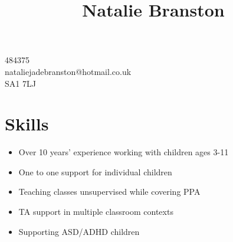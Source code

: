 \documentclass[10pt]{article}
\title{\bfseries\Huge Natalie Branston}
\date{}
\author{}
\begin{document}
\maketitle \vspace{-7em}

\section*{}
\faPhone {} 484375\\
\faEnvelope \quad nataliejadebranston@hotmail.co.uk\\
\faMapMarker \quad SA1 7LJ

\section*{Skills}
\begin{itemize} \setlength\itemsep{-0.25em}
    \item Over 10 years' experience working with children ages 3-11
	\item One to one support for individual children
	\item Teaching classes unsupervised while covering PPA
	\item TA support in multiple classroom contexts
	\item Supporting ASD/ADHD children
\end{itemize}

\end{document}
